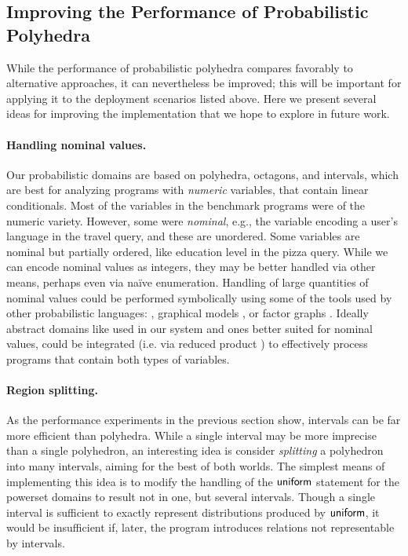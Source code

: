 \subsection{Improving the Performance of Probabilistic Polyhedra}

While the performance of probabilistic polyhedra compares favorably to
alternative approaches, it can nevertheless be improved; this will be
important for applying it to the deployment scenarios listed above.  Here we
present several ideas for improving the implementation that we hope to
explore in future work.

\paragraph*{Handling nominal values.}  

Our probabilistic domains are based on polyhedra, octagons, and
intervals, which are best for analyzing programs with \emph{numeric}
variables, that contain linear conditionals. Most of the variables in
the benchmark programs were of the numeric variety. However, some were
\emph{nominal}, e.g., the variable encoding a user's language in the
travel query, and these are unordered.  Some variables are nominal but
partially ordered, like education level in the pizza query.  While we
can encode nominal values as integers, they may be better handled via
other means, perhaps even via na\"ive enumeration. Handling of large
quantities of nominal values could be performed symbolically using
some of the tools used by other probabilistic languages:
\cite{claret12bayesian}, graphical models \cite{milch05blog}, or
factor graphs \cite{borgstrom11measure, pfeffer07ibal}. Ideally
abstract domains like used in our system and ones better suited for
nominal values, could be integrated (i.e. via reduced product
\cite{cousot79systematic}) to effectively process programs that
contain both types of variables.

\paragraph*{Region splitting.}

As the performance experiments in the previous section show, intervals
can be far more efficient than polyhedra.  While a single interval may
be more imprecise than a single polyhedron, an interesting idea is
consider \emph{splitting} a polyhedron into many intervals, aiming for
the best of both worlds.  The simplest means of implementing this idea
is to modify the handling of the $ \mathsf{uniform} $ statement for the
powerset domains to result not in one, but several intervals. Though a
single interval is sufficient to exactly represent distributions
produced by $ \mathsf{uniform} $, it would be insufficient if, later, the
program introduces relations not representable by intervals. 


